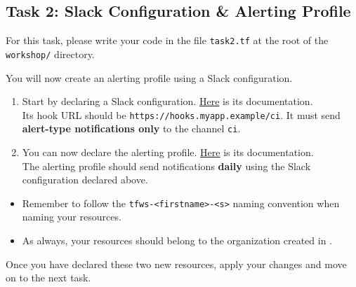 \subsection{Task 2: Slack Configuration \& Alerting Profile}\label{sec:task2}

\begin{note}
For this task, please write your code in the file \texttt{task2.tf}
at the root of the \texttt{workshop/} directory.
\end{note}

You will now create an alerting profile using a Slack configuration.

\begin{enumerate}
  \item Start by declaring a Slack configuration.
  \href{https://intuinewin.github.io/taikun-docs/resources/slack_configuration.html}{Here} is its documentation.\\

Its hook URL should be \texttt{https://hooks.myapp.example/ci}.
It must send \textbf{alert-type notifications only} to the channel \texttt{ci}.
  \item You can now declare the alerting profile.
    \href{https://intuinewin.github.io/taikun-docs/resources/alerting_profile.html}{Here} is its documentation.\\
    The alerting profile should send notifications \textbf{daily} using the Slack configuration declared above.
\end{enumerate}

\begin{warn}
  \begin{itemize}
    \item Remember to follow the \texttt{tfws-<firstname>-<s>} naming convention when naming your resources.
    \item As always, your resources should belong to the organization created in .
  \end{itemize}
\end{warn}

Once you have declared these two new resources, apply your changes and move on to the next task.
